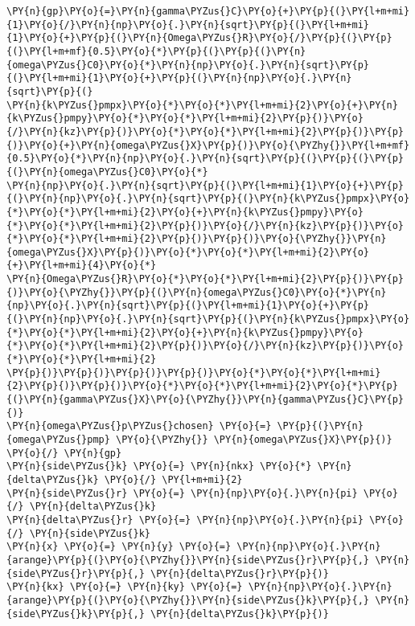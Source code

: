 \begin{Verbatim}[commandchars=\\\{\}]
\PY{n}{gp}\PY{o}{=}\PY{n}{gamma\PYZus{}C}\PY{o}{+}\PY{p}{(}\PY{l+m+mi}{1}\PY{o}{/}\PY{n}{np}\PY{o}{.}\PY{n}{sqrt}\PY{p}{(}\PY{l+m+mi}{1}\PY{o}{+}\PY{p}{(}\PY{n}{Omega\PYZus{}R}\PY{o}{/}\PY{p}{(}\PY{p}{(}\PY{l+m+mf}{0.5}\PY{o}{*}\PY{p}{(}\PY{p}{(}\PY{n}{omega\PYZus{}C0}\PY{o}{*}\PY{n}{np}\PY{o}{.}\PY{n}{sqrt}\PY{p}{(}\PY{l+m+mi}{1}\PY{o}{+}\PY{p}{(}\PY{n}{np}\PY{o}{.}\PY{n}{sqrt}\PY{p}{(}
\PY{n}{k\PYZus{}pmpx}\PY{o}{*}\PY{o}{*}\PY{l+m+mi}{2}\PY{o}{+}\PY{n}{k\PYZus{}pmpy}\PY{o}{*}\PY{o}{*}\PY{l+m+mi}{2}\PY{p}{)}\PY{o}{/}\PY{n}{kz}\PY{p}{)}\PY{o}{*}\PY{o}{*}\PY{l+m+mi}{2}\PY{p}{)}\PY{p}{)}\PY{o}{+}\PY{n}{omega\PYZus{}X}\PY{p}{)}\PY{o}{\PYZhy{}}\PY{l+m+mf}{0.5}\PY{o}{*}\PY{n}{np}\PY{o}{.}\PY{n}{sqrt}\PY{p}{(}\PY{p}{(}\PY{p}{(}\PY{n}{omega\PYZus{}C0}\PY{o}{*}
\PY{n}{np}\PY{o}{.}\PY{n}{sqrt}\PY{p}{(}\PY{l+m+mi}{1}\PY{o}{+}\PY{p}{(}\PY{n}{np}\PY{o}{.}\PY{n}{sqrt}\PY{p}{(}\PY{n}{k\PYZus{}pmpx}\PY{o}{*}\PY{o}{*}\PY{l+m+mi}{2}\PY{o}{+}\PY{n}{k\PYZus{}pmpy}\PY{o}{*}\PY{o}{*}\PY{l+m+mi}{2}\PY{p}{)}\PY{o}{/}\PY{n}{kz}\PY{p}{)}\PY{o}{*}\PY{o}{*}\PY{l+m+mi}{2}\PY{p}{)}\PY{p}{)}\PY{o}{\PYZhy{}}\PY{n}{omega\PYZus{}X}\PY{p}{)}\PY{o}{*}\PY{o}{*}\PY{l+m+mi}{2}\PY{o}{+}\PY{l+m+mi}{4}\PY{o}{*}
\PY{n}{Omega\PYZus{}R}\PY{o}{*}\PY{o}{*}\PY{l+m+mi}{2}\PY{p}{)}\PY{p}{)}\PY{o}{\PYZhy{}}\PY{p}{(}\PY{n}{omega\PYZus{}C0}\PY{o}{*}\PY{n}{np}\PY{o}{.}\PY{n}{sqrt}\PY{p}{(}\PY{l+m+mi}{1}\PY{o}{+}\PY{p}{(}\PY{n}{np}\PY{o}{.}\PY{n}{sqrt}\PY{p}{(}\PY{n}{k\PYZus{}pmpx}\PY{o}{*}\PY{o}{*}\PY{l+m+mi}{2}\PY{o}{+}\PY{n}{k\PYZus{}pmpy}\PY{o}{*}\PY{o}{*}\PY{l+m+mi}{2}\PY{p}{)}\PY{o}{/}\PY{n}{kz}\PY{p}{)}\PY{o}{*}\PY{o}{*}\PY{l+m+mi}{2}
\PY{p}{)}\PY{p}{)}\PY{p}{)}\PY{p}{)}\PY{o}{*}\PY{o}{*}\PY{l+m+mi}{2}\PY{p}{)}\PY{p}{)}\PY{o}{*}\PY{o}{*}\PY{l+m+mi}{2}\PY{o}{*}\PY{p}{(}\PY{n}{gamma\PYZus{}X}\PY{o}{\PYZhy{}}\PY{n}{gamma\PYZus{}C}\PY{p}{)}
\PY{n}{omega\PYZus{}p\PYZus{}chosen} \PY{o}{=} \PY{p}{(}\PY{n}{omega\PYZus{}pmp} \PY{o}{\PYZhy{}} \PY{n}{omega\PYZus{}X}\PY{p}{)} \PY{o}{/} \PY{n}{gp}
\PY{n}{side\PYZus{}k} \PY{o}{=} \PY{n}{nkx} \PY{o}{*} \PY{n}{delta\PYZus{}k} \PY{o}{/} \PY{l+m+mi}{2}
\PY{n}{side\PYZus{}r} \PY{o}{=} \PY{n}{np}\PY{o}{.}\PY{n}{pi} \PY{o}{/} \PY{n}{delta\PYZus{}k}
\PY{n}{delta\PYZus{}r} \PY{o}{=} \PY{n}{np}\PY{o}{.}\PY{n}{pi} \PY{o}{/} \PY{n}{side\PYZus{}k}
\PY{n}{x} \PY{o}{=} \PY{n}{y} \PY{o}{=} \PY{n}{np}\PY{o}{.}\PY{n}{arange}\PY{p}{(}\PY{o}{\PYZhy{}}\PY{n}{side\PYZus{}r}\PY{p}{,} \PY{n}{side\PYZus{}r}\PY{p}{,} \PY{n}{delta\PYZus{}r}\PY{p}{)}
\PY{n}{kx} \PY{o}{=} \PY{n}{ky} \PY{o}{=} \PY{n}{np}\PY{o}{.}\PY{n}{arange}\PY{p}{(}\PY{o}{\PYZhy{}}\PY{n}{side\PYZus{}k}\PY{p}{,} \PY{n}{side\PYZus{}k}\PY{p}{,} \PY{n}{delta\PYZus{}k}\PY{p}{)}

\end{Verbatim}

